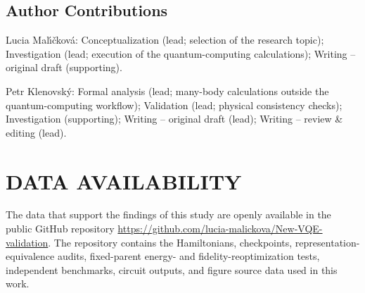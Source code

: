 \documentclass[
 aip,
 jcp,
 amsmath,amssymb,
 preprint
]{revtex4-2}
\begin{document}
\subsection*{Author Contributions}
Lucia Mal\'{\i}\v{c}kov\'a: Conceptualization (lead; selection of the research topic); Investigation (lead; execution of the quantum-computing calculations); Writing -- original draft (supporting).

Petr Klenovsk\'y: Formal analysis (lead; many-body calculations outside the quantum-computing workflow); Validation (lead; physical consistency checks); Investigation (supporting); Writing -- original draft (lead); Writing -- review \& editing (lead).

\section*{DATA AVAILABILITY}
The data that support the findings of this study are openly available in the public GitHub repository \url{https://github.com/lucia-malickova/New-VQE-validation}. The repository contains the Hamiltonians, checkpoints, representation-equivalence audits, fixed-parent energy- and fidelity-reoptimization tests, independent benchmarks, circuit outputs, and figure source data used in this work.


\end{document}
